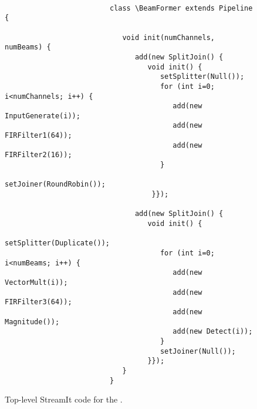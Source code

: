 \begin{figure}
  \begin{center}  \\
    \hspace{0.3in}  \vspace{-6pt} \caption{Execution traces for the (a)
    original (on 64 tiles) and (b) load-balanced (on 16 tiles)
    partitionings of the \BeamFormer.  Graphs are shaded as in
    Figure~\ref{fig:fm-blood}. \protect\label{fig:beam-blood}}
\end{center}
\vspace{24pt}
\small
\begin{verbatim}
                         class \BeamFormer extends Pipeline {
                         
                            void init(numChannels, numBeams) {
                               add(new SplitJoin() { 
                                  void init() {
                                     setSplitter(Null());
                                     for (int i=0; i<numChannels; i++) {
                                        add(new InputGenerate(i));
                                        add(new FIRFilter1(64));
                                        add(new FIRFilter2(16));
                                     }
                                     setJoiner(RoundRobin());   
                                   }});
                            
                               add(new SplitJoin() {
                                  void init() {
                                     setSplitter(Duplicate());
                                     for (int i=0; i<numBeams; i++) {
                                        add(new VectorMult(i));
                                        add(new FIRFilter3(64));
                                        add(new Magnitude());
                                        add(new Detect(i));
                                     }
                                     setJoiner(Null());
                                  }});
                            }
                         }
\end{verbatim}
\caption{\protect\small Top-level StreamIt code for the \BeamFormer.\protect\label{fig:beamcode}}
\end{figure}


